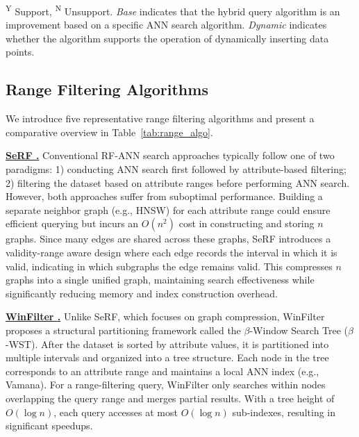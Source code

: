 \documentclass[sigconf, nonacm]{acmart}
\begin{document}
\begin{sloppypar}
\begin{table}[t]
    \vspace{0.2em} %
	\footnotesize{
            \begin{minipage}{\linewidth}
            \textsuperscript{Y} Support, 
            \textsuperscript{N} Unsupport.
            \textit{Base} indicates that the hybrid query algorithm is an improvement based on a specific ANN search algorithm. 
    		\textit{Dynamic} indicates whether the algorithm supports the operation of dynamically inserting data points.
            \end{minipage} 
        }
	
\end{table}

\subsection{Range Filtering Algorithms}

We introduce five representative range filtering algorithms and present a comparative overview in Table~\ref{tab:range_algo}.

\vspace{1em}
\noindent\textbf{\underline{SeRF \cite{serf}.}}  
Conventional RF-ANN search approaches typically follow one of two paradigms: 1) conducting ANN search first followed by attribute-based filtering; 2) filtering the dataset based on attribute ranges before performing ANN search. However, both approaches suffer from suboptimal performance. Building a separate neighbor graph (e.g., HNSW) for each attribute range could ensure efficient querying but incurs an $O(n^2)$ cost in constructing and storing $n$ graphs. Since many edges are shared across these graphs, SeRF introduces a validity-range aware design where each edge records the interval in which it is valid, indicating in which subgraphs the edge remains valid. This compresses $n$ graphs into a single unified graph, maintaining search effectiveness while significantly reducing memory and index construction overhead.

\vspace{1em}
\noindent\textbf{\underline{WinFilter \cite{winFilter}.}}  
Unlike SeRF, which focuses on graph compression, WinFilter proposes a structural partitioning framework called the $\beta$-Window Search Tree ($\beta$-WST). After the dataset is sorted by attribute values, it is partitioned into multiple intervals and organized into a tree structure. Each node in the tree corresponds to an attribute range and maintains a local ANN index (e.g., Vamana). For a range-filtering query, WinFilter only searches within nodes overlapping the query range and merges partial results. With a tree height of $O(\log n)$, each query accesses at most $O(\log n)$ sub-indexes, resulting in significant speedups.


\end{sloppypar}
\end{document}
